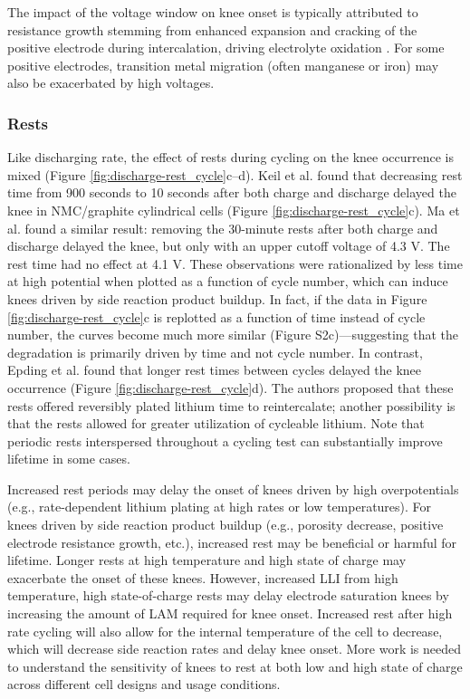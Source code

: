 \documentclass[journal=jpclcd,manuscript=article]{achemso}
\begin{document}
The impact of the voltage window on knee onset is typically attributed to resistance growth stemming from enhanced expansion and cracking of the positive electrode during intercalation, driving electrolyte oxidation \cite{broussely_main_2005, ma_editors_2019, aiken_accelerated_2020}. For some positive electrodes, transition metal migration (often manganese or iron) may also be exacerbated by high voltages. \cite{joshi_effects_2014, gilbert_transition_2017, ma_novel_2019}

\subsubsection{Rests}

Like discharging rate, the effect of rests during cycling on the knee occurrence is mixed (Figure \ref{fig:discharge-rest_cycle}c--d).
Keil et al.\cite{keil_linear_2019} found that decreasing rest time from 900 seconds to 10 seconds after both charge and discharge delayed the knee in NMC/graphite cylindrical cells (Figure \ref{fig:discharge-rest_cycle}c).
Ma et al.\cite{ma_editors_2019} found a similar result: removing the 30-minute rests after both charge and discharge delayed the knee, but only with an upper cutoff voltage of 4.3 V. The rest time had no effect at 4.1 V.
These observations were rationalized by less time at high potential when plotted as a function of cycle number, which can induce knees driven by side reaction product buildup.
In fact, if the data in Figure \ref{fig:discharge-rest_cycle}c is replotted as a function of time instead of cycle number, the curves become much more similar (Figure S2c)---suggesting that the degradation is primarily driven by time and not cycle number.
In contrast, Epding et al.\cite{epding_investigation_2019} found that longer rest times between cycles delayed the knee occurrence (Figure \ref{fig:discharge-rest_cycle}d). The authors proposed that these rests offered reversibly plated lithium time to reintercalate; another possibility is that the rests allowed for greater utilization of cycleable lithium\cite{rashid_effect_2015}.
Note that periodic rests interspersed throughout a cycling test can substantially improve lifetime in some cases.\cite{raj_investigation_2020}

Increased rest periods may delay the onset of knees driven by high overpotentials (e.g., rate-dependent lithium plating at high rates or low temperatures).
For knees driven by side reaction product buildup (e.g., porosity decrease, positive electrode resistance growth, etc.), increased rest may be beneficial or harmful for lifetime.
Longer rests at high temperature and high state of charge may exacerbate the onset of these knees.
However, increased LLI from high temperature, high state-of-charge rests may delay electrode saturation knees by increasing the amount of LAM required for knee onset.\cite{mao_calendar_2017, uddin_viability_2018}
Increased rest after high rate cycling will also allow for the internal temperature of the cell to decrease, which will decrease side reaction rates and delay knee onset.
More work is needed to understand the sensitivity of knees to rest at both low and high state of charge across different cell designs and usage conditions.
\end{document}
